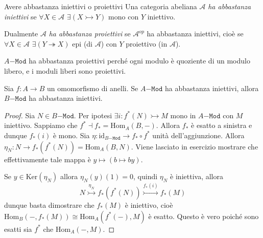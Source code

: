 \begin{definition}{Avere abbastanza iniettivi o proiettivi}
    Una categoria abeliana \(\mathcal{A}\) \emph{ha abbastanza iniettivi} se
    \(\forall X \in \mathcal{A}\) \(\exists (X \rightarrowtail Y)\) mono con \(Y\)
    iniettivo.

    Dualmente \(\mathcal{A}\) \emph{ha abbastanza proiettivi} se
    \(\mathcal{A}^{op}\) ha abbastanza iniettivi, cioè se \(\forall X \in
    \mathcal{A}\) \(\exists (Y \twoheadrightarrow X)\) epi (di \(\mathcal{A}\))
    con \(Y\) proiettivo (in \(\mathcal{A}\)).
\end{definition}

\begin{example}{}
    \(A\mathtt{-Mod}\) ha abbastanza proiettivi perché ogni modulo è quoziente
    di un modulo libero, e i moduli liberi sono proiettivi.
\end{example}

\begin{proposition}{}
    Sia \(f : A \to B\) un omomorfismo di anelli. Se \(A\mathtt{-Mod}\) ha
    abbastanza iniettivi, allora \(B\mathtt{-Mod}\) ha abbastanza iniettivi.
\end{proposition}

\begin{proof}{}
    Sia \(N \in B\mathtt{-Mod}\). Per ipotesi \(\exists i : f^{*}{(N)}
    \rightarrowtail M\) mono in \(A\mathtt{-Mod}\) con \(M\) iniettivo.
    Sappiamo che \(f^{*} \dashv f_* = \mathrm{Hom}_A{(B, -)}\). Allora \(f_*\) è
    esatto a sinistra e dunque \(f_*{(i)}\) è mono. Sia \(\eta :
    \mathrm{id}_{B\mathtt{-Mod}} \to f_* \circ f^{*}\) unità dell'aggiunzione.
    Allora \(\eta_N : N \to f_* {(f^{*}{(N)})} = \mathrm{Hom}_A{(B, N)}\). Viene
    lasciato in esercizio mostrare che effettivamente tale mappa è \(y \mapsto
    {(b \mapsto by)}\). 

    Se \(y \in \mathrm{Ker}{(\eta_N)}\) allora \(\eta_N{(y)}{(1)} = 0\), quindi
    \(\eta_N\) è iniettiva, allora
    \[
      N \overset{\eta_N}{\rightarrowtail } f_*{(f^{*}{(N)})}
      \overset{f_*{(i)}}{\rightarrowtail } f_*{(M)}
    \]
    dunque basta dimostrare che \(f_*{(M)}\) è iniettivo, cioè \\
    \(\mathrm{Hom}_B{(-, f_*{(M)})} \cong \mathrm{Hom}_A{(f^{*}{(-)}, M)}\) è esatto. Questo è vero poiché sono esatti
    sia \(f^{*}\) che \(\mathrm{Hom}_A{(-, M)}\).
\end{proof}

